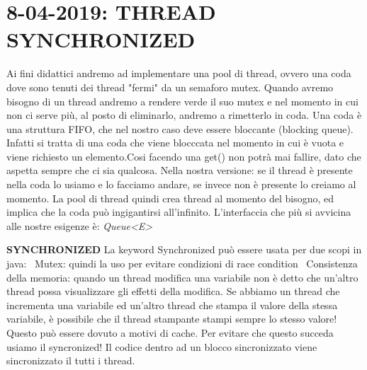 

\newpage
\section{8-04-2019: THREAD SYNCHRONIZED}

\noindent Ai fini didattici andremo ad implementare una pool di thread, ovvero una coda dove sono tenuti dei thread "fermi" da un semaforo mutex. Quando avremo bisogno di un thread andremo a rendere verde il suo mutex e nel momento in cui non ci serve più, al posto di eliminarlo, andremo a rimetterlo in coda. \newline
Una coda è una struttura FIFO, che nel nostro caso deve essere bloccante (blocking queue). Infatti si tratta di una coda che viene blocccata nel momento in cui è vuota e viene richiesto un elemento.Cosi facendo una get() non potrà mai fallire, dato che aspetta sempre che ci sia qualcosa. \newline
Nella nostra versione: se il thread è presente nella coda lo usiamo e lo facciamo andare, se invece non è presente lo creiamo al momento. La pool di thread quindi crea thread al momento del bisogno, ed implica che la coda può ingigantirsi all'infinito. \newline
L'interfaccia che più si avvicina alle nostre esigenze è: \textit{Queue<E>} 


\noindent \textbf{SYNCHRONIZED} \newline
La keyword Synchronized può essere usata per due scopi in java: \newline
\textbullet\ Mutex: quindi la uso per evitare condizioni di race condition \newline
\textbullet\ Consistenza della memoria: quando un thread modifica una variabile non è detto che un'altro thread possa visualizzare gli effetti della modifica. Se abbiamo un thread che incrementa una variabile ed un'altro thread che stampa il valore della stessa variabile, è possibile che il thread stampante stampi sempre lo stesso valore! Questo può essere dovuto a motivi di cache. Per evitare che questo succeda usiamo il syncronized! Il codice dentro ad un blocco sincronizzato viene sincronizzato il tutti i thread.

